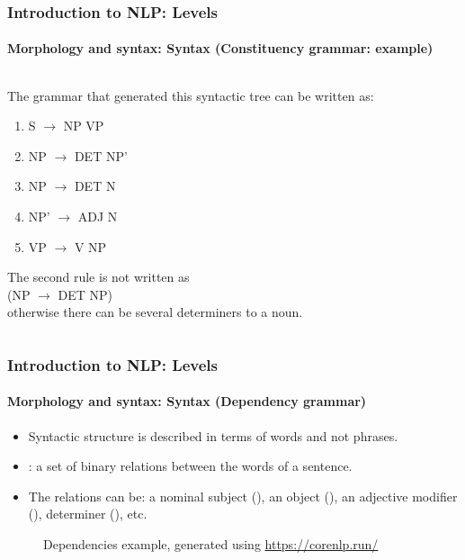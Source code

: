 \documentclass[xcolor=table]{beamer}
\begin{document}
\begin{frame}
\frametitle{Introduction to NLP: Levels}
\framesubtitle{Morphology and syntax: Syntax (Constituency grammar: example)}

\begin{columns}
	\begin{column}{0.52\textwidth}
	The grammar that generated this syntactic tree can be written as: 
	
	\begin{enumerate}
		\item S $ \rightarrow $ NP VP
		\item NP $ \rightarrow $ DET NP'
		\item NP $ \rightarrow $ DET N
		\item NP' $ \rightarrow $ ADJ N
		\item VP $ \rightarrow $ V NP
	\end{enumerate}

	The second rule is not written as \\(NP $ \rightarrow $ DET NP)\\ 
	otherwise there can be several determiners to a noun.
	
	\end{column}
	\begin{column}{0.42\textwidth}
	\end{column}%
\end{columns}


\end{frame}

\begin{frame}
\frametitle{Introduction to NLP: Levels}
\framesubtitle{Morphology and syntax: Syntax (Dependency grammar)}

\begin{itemize}
	\item Syntactic structure is described in terms of words and not phrases.
	\item {}: a set of binary relations between the words of a sentence.
	\item The relations can be: a nominal subject (), an object (), an adjective modifier (), determiner (), etc.
\end{itemize}

\begin{figure}
	\centering
	\caption{Dependencies example, generated using \url{https://corenlp.run/}}
\end{figure}

\end{frame}
\end{document}
